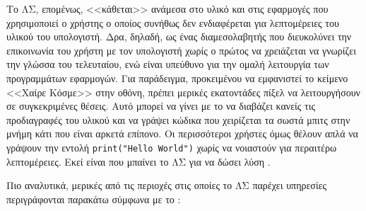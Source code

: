 \documentclass{report}
\begin{document}
Το ΛΣ, επομένως, <<κάθεται>> ανάμεσα στο υλικό και στις εφαρμογές που χρησιμοποιεί ο χρήστης ο οποίος συνήθως δεν ενδιαφέρεται για λεπτομέρειες του υλικού του υπολογιστή. Δρα, δηλαδή, ως ένας διαμεσολαβητής που διευκολύνει την επικοινωνία του χρήστη με τον υπολογιστή χωρίς ο πρώτος να χρειάζεται να γνωρίζει την γλώσσα του τελευταίου, ενώ είναι υπεύθυνο για την ομαλή λειτουργία των προγραμμάτων εφαρμογών. Για παράδειγμα, προκειμένου να εμφανιστεί το κείμενο <<Χαίρε Κόσμε>> στην οθόνη, πρέπει μερικές εκατοντάδες πίξελ να λειτουργήσουν σε συγκεκριμένες θέσεις. Αυτό μπορεί να γίνει με το να διαβάζει κανείς τις προδιαγραφές του υλικού και να γράψει κώδικα που χειρίζεται τα σωστά μπιτς στην μνήμη κάτι που είναι αρκετά επίπονο. Οι περισσότεροι χρήστες όμως θέλουν απλά να γράψουν την εντολή \texttt{print("Hello World")} χωρίς να νοιαστούν για περαιτέρω λεπτομέρειες. Εκεί είναι που μπαίνει το ΛΣ για να δώσει λύση \cite{elements_of_computing}.

Πιο αναλυτικά, μερικές από τις περιοχές στις οποίες το ΛΣ παρέχει υπηρεσίες περιγράφονται παρακάτω σύμφωνα με το \cite{stallings}:
\end{document}
